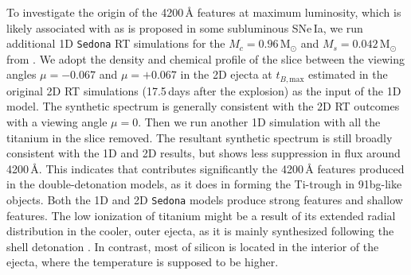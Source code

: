 \documentclass[twocolumn]{aastex631}
\begin{document}
\begin{CJK*}{UTF8}{gbsn}
To investigate the origin of the 4200\,\r{A} features at maximum luminosity, which is likely associated with  as is proposed in some subluminous SNe\,Ia, we run additional 1D \texttt{Sedona} RT simulations for the $M_c=0.96\,\mathrm{M_\odot}$ and $M_s=0.042\,\mathrm{M_\odot}$ from \citet[adopted in the calculations of \citealp{Shen_2D_2021}]{Boos_2021}. We adopt the density and chemical profile of the slice between the viewing angles $\mu=-0.067$ and $\mu=+0.067$ in the 2D ejecta at $t_{B,\mathrm{max}}$ estimated in the original 2D RT simulations (17.5\,days after the explosion) as the input of the 1D model. The synthetic spectrum is generally consistent with the 2D RT outcomes with a viewing angle $\mu=0$. Then we run another 1D simulation with all the titanium in the slice removed. The resultant synthetic spectrum is still broadly consistent with the 1D and 2D results, but shows less suppression in flux around 4200\,\r{A}. This indicates that  contributes significantly the 4200\,\r{A} features produced in the double-detonation models, as it does in forming the Ti-trough in 91bg-like objects. Both the 1D and 2D \texttt{Sedona} models produce strong  features and shallow  features. The low ionization of titanium might be a result of its extended radial distribution in the cooler, outer ejecta, as it is mainly synthesized following the shell detonation \citep{Fink_DD_2010,Boos_2021}. In contrast, most of silicon is located in the interior of the ejecta, where the temperature is supposed to be higher. %


\end{CJK*}
\end{document}
